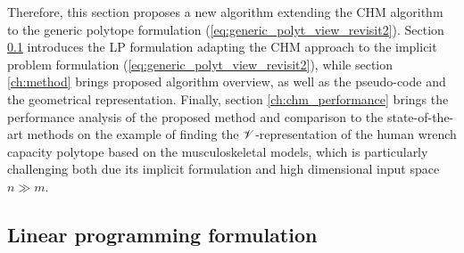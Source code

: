 Therefore, this section proposes a new algorithm extending the CHM algorithm to the generic polytope formulation (\ref{eq:generic_polyt_view_revisit2}). Section \ref{ch:lp_adapt} introduces the LP formulation adapting the CHM approach to the implicit problem formulation (\ref{eq:generic_polyt_view_revisit2}), while section \ref{ch:method} brings proposed algorithm overview, as well as the pseudo-code and the geometrical representation. Finally, section \ref{ch:chm_performance} brings the performance analysis of the proposed method and comparison to the state-of-the-art methods on the example of finding the $\mathscr{V}$-representation of the human wrench capacity polytope based on the musculoskeletal models, which is particularly challenging both due its implicit formulation and high dimensional input space $n\gg m$.

\subsection{Linear programming formulation}
\label{ch:lp_adapt}

